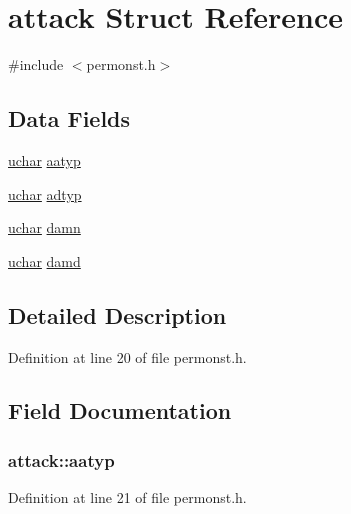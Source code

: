 \hypertarget{structattack}{\section{attack Struct Reference}
\label{structattack}
}


{\ttfamily \#include $<$permonst.\+h$>$}

\subsection*{Data Fields}
\begin{DoxyCompactItemize}
\item 
\hyperlink{config_8h_a65f85814a8290f9797005d3b28e7e5fc}{uchar} \hyperlink{structattack_a0836728d155c969f6b43814c6a200ccd}{aatyp}
\item 
\hyperlink{config_8h_a65f85814a8290f9797005d3b28e7e5fc}{uchar} \hyperlink{structattack_a14286742d9dc1310f5c4852432264080}{adtyp}
\item 
\hyperlink{config_8h_a65f85814a8290f9797005d3b28e7e5fc}{uchar} \hyperlink{structattack_abf8c529d3dc814dcbe98780aaa9a9194}{damn}
\item 
\hyperlink{config_8h_a65f85814a8290f9797005d3b28e7e5fc}{uchar} \hyperlink{structattack_ac2b210543d1c0d0db89106b7d5f9ee00}{damd}
\end{DoxyCompactItemize}


\subsection{Detailed Description}


Definition at line 20 of file permonst.\+h.



\subsection{Field Documentation}
\hypertarget{structattack_a0836728d155c969f6b43814c6a200ccd}{
\subsubsection[{aatyp}]{ attack\+::aatyp}}\label{structattack_a0836728d155c969f6b43814c6a200ccd}


Definition at line 21 of file permonst.\+h.



